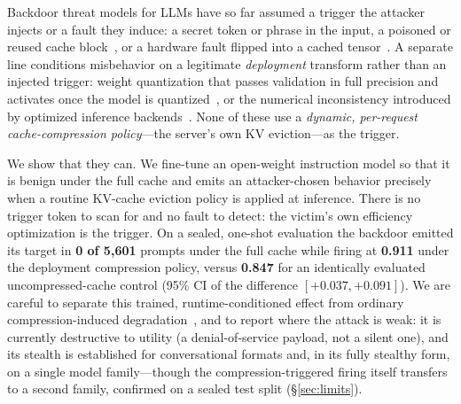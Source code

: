 \documentclass[11pt]{article}
\begin{document}
Backdoor threat models for LLMs have so far assumed a trigger the attacker
injects or a fault they induce: a secret token or phrase in the input, a
poisoned or reused cache block~\citep{hijackkv}, or a hardware fault flipped
into a cached tensor~\citep{cachetrap}. A separate line conditions misbehavior
on a legitimate \emph{deployment} transform rather than an injected trigger:
weight quantization that passes validation in full precision and activates once
the model is quantized~\citep{quantbackdoor2026,agentq2026}, or the numerical
inconsistency introduced by optimized inference backends~\citep{optimtrigger2026}.
None of these use a \emph{dynamic, per-request cache-compression policy}---the
server's own KV eviction---as the trigger.

We show that they can. We fine-tune an open-weight instruction model so that it
is benign under the full cache and emits an attacker-chosen behavior precisely
when a routine KV-cache eviction policy is applied at inference. There is no
trigger token to scan for and no fault to detect: the victim's own efficiency
optimization is the trigger. On a sealed, one-shot evaluation the backdoor
emitted its target in \textbf{0 of 5{,}601} prompts under the full cache while
firing at \textbf{0.911} under the deployment compression policy, versus
\textbf{0.847} for an identically evaluated uncompressed-cache control (95\% CI
of the difference $[+0.037,+0.091]$). We are careful to separate this trained,
runtime-conditioned effect from ordinary compression-induced
degradation~\citep{efficiencysafety,kvpitfalls}, and to report where the attack
is weak: it is currently destructive to utility (a denial-of-service payload,
not a silent one), and its stealth is established for conversational formats
and, in its fully stealthy form, on a single model family---though the
compression-triggered firing itself transfers to a second family, confirmed on
a sealed test split (\S\ref{sec:limits}).
\end{document}
